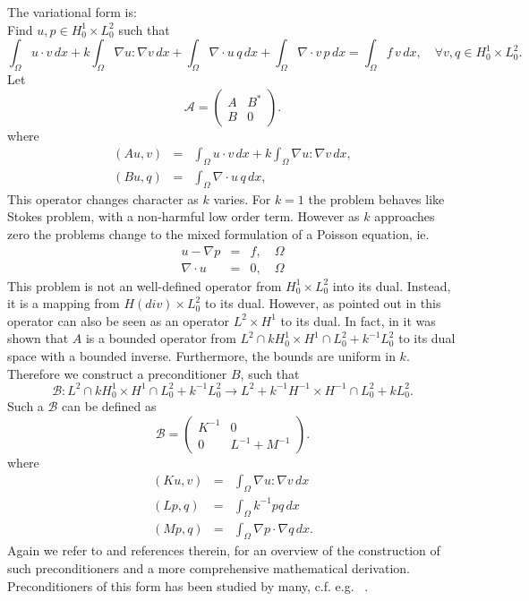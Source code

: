 The variational form is: \\ 
Find $u,p \in H^1_0 \times L_0^2$ such that  
\[
\int_\Omega u \cdot v \,  dx + 
k \int_\Omega \nabla u : \nabla v \,  dx + 
\int_\Omega \nabla \cdot u \, q \,  dx +  
\int_\Omega \nabla \cdot v \, p \,  dx = \int_\Omega f\, v\, dx   , \quad \forall v,q \in H^1_0 \times L_0^2.
\]
Let 
\[
\mathcal{A}  =
\begin{pmatrix} A & B^* \\ B & 0 \end{pmatrix}.
\]
where 
\begin{eqnarray}
(A u, v) &=& \int_\Omega u \cdot v \,  dx +  k \int_\Omega \nabla u : \nabla v \,  dx, \\  
(B u, q) &=& \int_\Omega \nabla \cdot u \, q \,  dx,    
\end{eqnarray}
This operator changes character as $k$ varies.  
For $k=1$ the problem behaves like Stokes problem, with 
a non-harmful low order term. However as $k$ approaches
zero the problems change to the mixed formulation of 
a Poisson equation, ie. 
\begin{eqnarray*}
u - \nabla p &=& f, \quad \Omega \\
\nabla \cdot u  &=& 0, \quad \Omega
\end{eqnarray*}
This problem is not an well-defined operator from 
$H^1_0 \times L_0^2$ into its dual. Instead, it
is a mapping from $H(div) \times L_0^2$  to its dual. 
However, as pointed out in \cite{M-W-04} this operator
can also be seen as an operator $L^2 \times H^1$ to its dual.  
In fact, in \cite{M-T-W-02,M-W-04} it was shown that 
 $A$ is a bounded operator from
$L^2 \cap k H^1_0 \times H^1 \cap L_0^2 + k^{-1} L_0^2$ to its dual space
with a bounded inverse. Furthermore, the bounds are uniform in $k$. 
Therefore we 
construct a preconditioner $B$, such that  
\[
\mathcal{B}: L^2 \cap k H^1_0 \times H^1 \cap L_0^2 + k^{-1} L_0^2 \rightarrow 
L^2 + k^{-1} H^{-1} \times H^{-1} \cap L_0^2 + k L_0^2  .
\] 
Such a $\mathcal{B}$ can be defined as 
\[
\mathcal{B} 
= 
\begin{pmatrix} K^{-1} & 0 \\ 0 & L^{-1} + M^{-1} \end{pmatrix}.
\]
where 
\begin{eqnarray}
(K u, v) &=& \int_\Omega \nabla u: \nabla v \, dx \\ 
(L p, q) &=& \int_\Omega k^{-1} p q \, dx \\   
(M p, q) &=& \int_\Omega \nabla p \cdot  \nabla q \, dx .   
\end{eqnarray}
Again we refer to \cite{M-W-09} and references therein,  for an overview of the construction of such preconditioners and 
a more comprehensive mathematical derivation.  
Preconditioners of this form has been studied by many, c.f. e.g. ~\cite{C-C-88, E-S-W-text, M-W-04, M-W-09, T-99}. 

